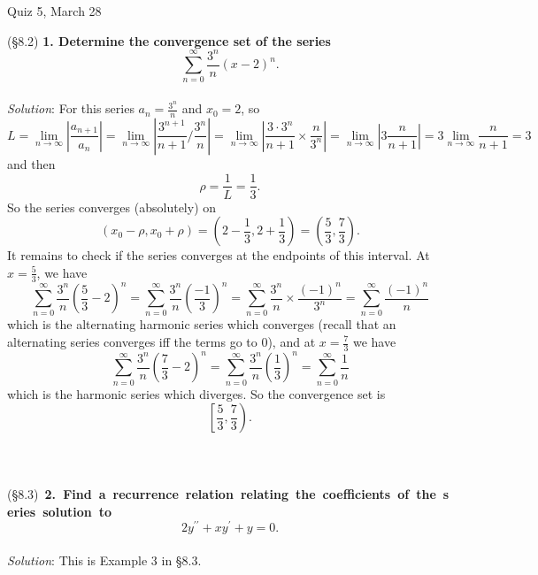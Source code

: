 \documentclass[12pt]{article}
\begin{document}
\newpage
\begin{center}
{\Large Quiz 5, March 28}
\end{center}
(\S 8.2) \textbf{1. Determine the convergence set of the series}
$$\sum_{n=0}^\infty \frac{3^n}{n} (x-2)^n.$$
~\\
\emph{Solution}:  For this series $a_n = \frac{3^n}{n}$ and $x_0 = 2$, so
$$L	= \lim_{n \to \infty} \left| \frac{a_{n+1}}{a_n} \right|
	= \lim_{n \to \infty} \left| \frac{3^{n+1}}{n+1} / \frac{3^n}{n} \right|
	= \lim_{n \to \infty} \left| \frac{3 \cdot 3^n}{n+1} \times \frac{n}{3^n} \right|
	= \lim_{n \to \infty} \left| 3 \frac{n}{n+1} \right|
	= 3 \lim_{n \to \infty} \frac{n}{n+1}
	= 3$$
and then
$$\rho = \frac{1}{L} = \frac{1}{3}.$$
So the series converges (absolutely) on
$$(x_0 - \rho, x_0 + \rho) = \left( 2 - \frac{1}{3}, 2 + \frac{1}{3} \right) = \left( \frac{5}{3}, \frac{7}{3} \right).$$
It remains to check if the series converges at the endpoints of this interval.  At $x = \frac{5}{3}$, we have
$$\sum_{n=0}^\infty \frac{3^n}{n} \left( \frac{5}{3} - 2 \right)^n = \sum_{n=0}^\infty \frac{3^n}{n} \left( \frac{-1}{3} \right)^n 
= \sum_{n=0}^\infty \frac{3^n}{n} \times \frac{(-1)^n}{3^n} = \sum_{n=0}^\infty \frac{(-1)^n}{n}$$
which is the alternating harmonic series which converges (recall that an alternating series converges iff the terms go to 0), 
and at $x = \frac{7}{3}$ we have
$$\sum_{n=0}^\infty \frac{3^n}{n} \left( \frac{7}{3} - 2 \right)^n = \sum_{n=0}^\infty \frac{3^n}{n} \left( \frac{1}{3} \right)^n 
= \sum_{n=0}^\infty \frac{1}{n}$$
which is the harmonic series which diverges. So the convergence set is
$$\left[ \frac{5}{3}, \frac{7}{3} \right).$$
~\\~\\~\\
\mbox{(\S 8.3) \textbf{2. Find a recurrence relation relating the coefficients of the series solution to}}
$$2y^{\prime\prime} + xy^\prime +y = 0.$$
~\\
\emph{Solution}: 
This is Example 3 in \S 8.3.

\newpage
\end{document}
